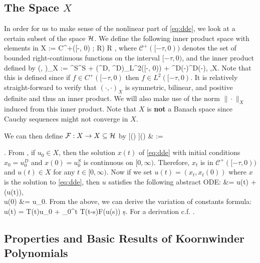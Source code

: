 \subsection{The Space \(X\)}

In order for us to make sense of the nonlinear part of \cref{eq:dde}, we look at a certain subset of the space \(\mathcal H\). We define the following inner product space with elements in 
\be
    X := \mathcal C^+([-\tau, 0) ; \mathbb R) \times \mathbb R \subseteq \mcH,
\ee
where \(\mathcal C^+([-\tau, 0))\) denotes the set of bounded right-continuous functions on the interval \([-\tau, 0)\), and the inner product defined by
\be
    (\Phi, \Psi)_X := \Phi^S\Psi^S +  \tau (\Phi^D, \Psi^D)_{L^2([-\tau, 0))} + \Phi^D(-\tau)\Psi^D(-\tau), \quad \Phi,\Psi\in X.
\ee
Note that this is defined since if \(f\in C^+([-\tau, 0)\) then \(f\in L^2([-\tau,0)\). It is relatively straight-forward to verify that \((\cdot, \cdot)_X\) is symmetric, bilinear, and positive definite and thus an inner product. We will also make use of the norm \(\|\cdot\|_X\) induced from this inner product. Note that \(X\) is \textbf{not} a Banach space since Cauchy sequences might not converge in \(X\). 

We can then define \(\mathcal F:X\to X\subseteq\mathcal H\) by 
\bea \label{mcF}
    [\mcF (\Psi) ](\theta) & := \begin{cases}
    0, &  \theta \in[-\tau, 0),   \vspace{0.4em}\\ 
    F \left( \Psi^D(-\tau) \right), & \theta = 0, 
    \end{cases}  .
\eea
From \cite[Thm.~2.4.1]{CZ95}, if \(u_0\in X\), then the solution \(x(t)\) of \cref{eq:dde} with initial conditions \(x_0 =  u_0^D\) and \(x(0) = u_0^S\) is continuous on \([0,\infty)\). Therefore, \(x_t\) is in \(\mathcal C^+([-\tau, 0))\) and \(u(t)\in X\) for any \(t\in[0,\infty)\). Now if we set \(u(t) = (x_t, x_t(0))\) where \(x\) is the solution to \cref{eq:dde}, then \(u\) satisfies the following abstract ODE:
\bea\label{eq:abstract_ode}
     &= \mcA u(t) + \mcF(u(t)), \\
    u(0) &= u_0.
\eea
From the above, we can derive the variation of constants formula:
\be
    u(t) = T(t)u_0 + \int_0^t T(t-s)\mathcal F(u(s)) \d s.
\ee
For a derivation c.f. \cite[pg.~105]{P83}.

\subsection{Properties and Basic Results of Koornwinder Polynomials}


